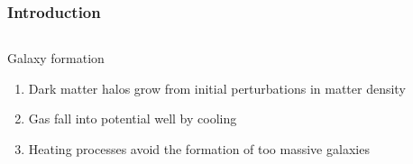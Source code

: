 \begin{frame}
    \frametitle{Introduction}
    \begin{columns}
        \begin{column}{0.5\textwidth}
            \begin{block}{Galaxy formation}
                \begin{enumerate}
                    \item<1-> Dark matter halos grow from initial perturbations
                        in matter density
                    \item<2-> Gas fall into potential well by cooling
                    \item<3-> Heating processes avoid the formation of too
                        massive galaxies
                \end{enumerate}
            \end{block}
        \end{column}
        \begin{column}{0.5\textwidth}
            \begin{minipage}[c][0.6\textheight][c]{\linewidth}
            \end{minipage}
        \end{column}
    \end{columns}
\end{frame}

